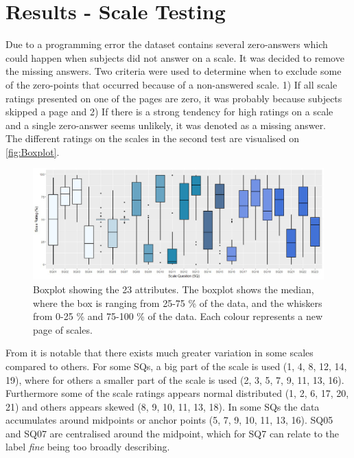 \section{Results - Scale Testing}
\label{ResultsScaleTesting}
%
Due to a programming error the dataset contains several zero-answers which could happen when subjects did not answer on a scale. It was decided to remove the missing answers. Two criteria were used to determine when to exclude some of the zero-points that occurred because of a non-answered scale. 1) If all scale ratings presented on one of the pages are zero, it was probably because subjects skipped a page and 2) If there is a strong tendency for high ratings on a scale and a single zero-answer seems unlikely, it was denoted as a missing answer.\\

\noindent
The different ratings on the scales in the second test are visualised on \autoref{fig:Boxplot}.
%
%

\begin{figure}[!b]
	\centering
	\includegraphics[width=6.9in]{Figure/Boksplot23.png}
	\hfil
	\caption{Boxplot showing the 23 attributes. The boxplot shows the median, where the box is ranging from 25-75 \% of the data, and the whiskers from 0-25 \% and 75-100 \% of the data. Each colour represents a new page of scales.}
	\label{fig:Boxplot}	
\end{figure}
%
From it is notable that there exists much greater variation in some scales compared to others. For some SQs, a big part of the scale is used (1, 4, 8, 12, 14, 19), where for others a smaller part of the scale is used (2, 3, 5, 7, 9, 11, 13, 16). Furthermore some of the scale ratings appears normal distributed (1, 2, 6, 17, 20, 21) and others appears skewed (8, 9, 10, 11, 13, 18). In some SQs the data accumulates around midpoints or anchor points (5, 7, 9, 10, 11, 13, 16). SQ05 and SQ07 are centralised around the midpoint, which for SQ7 can relate to the label \textit{fine} being too broadly describing. 

